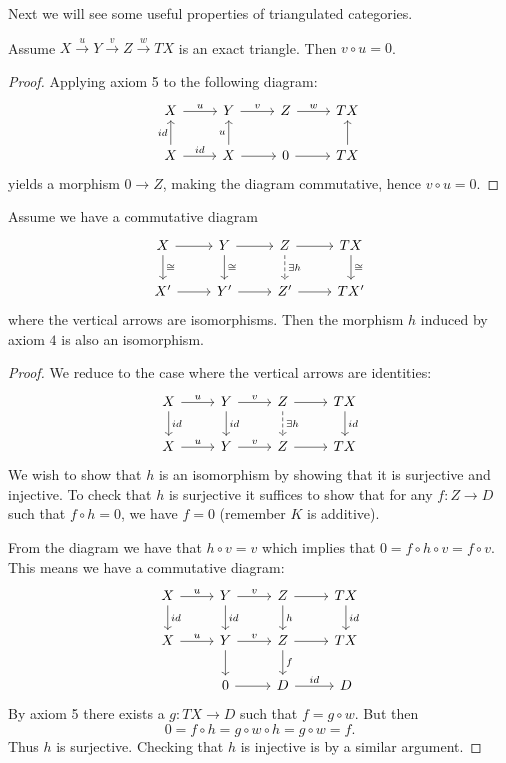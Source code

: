 \documentclass[a4paper, UKenglish]{report}
\begin{document}
Next we will see some useful properties of triangulated categories.

\begin{proposition} 
    \label{prop:compzero}
    Assume $X \xrightarrow{u}  Y \xrightarrow{v} Z \xrightarrow{w} TX$ is an exact triangle. Then $v \circ u = 0$.
\end{proposition}

\begin{proof}
    Applying axiom 5 to the following diagram:
    \[
        \begin{tikzcd}
            X  \ar{r}{u} & Y  \ar{r}{v} & Z  \ar{r}{w} &  TX \\
            X \ar{u}{id} \ar{r}{id} & X \ar{u}{u} \ar{r} & 0 \ar{r} & \ar{u} TX 
        \end{tikzcd}
   \]
yields a morphism $0 \to Z$, making the diagram commutative, hence $v \circ u = 0$.
\end{proof}

\begin{proposition}[$5$-lemma]
    Assume we have a commutative diagram
    \[
        \begin{tikzcd}
            X \ar{d}{\cong} \ar{r} & Y \ar{d}{\cong} \ar{r} & Z \arrow[dashed]{d}{ \exists h} \ar{r} & \ar{d}{\cong} TX \\
            X' \ar{r} & Y' \ar{r} & Z' \ar{r} & TX' 
        \end{tikzcd} 
    \]
    where the vertical arrows are isomorphisms. Then the morphism $h$ induced by axiom $4$ is also an isomorphism.
\end{proposition}

\begin{proof}
    We reduce to the case where the vertical arrows are identities:
    \[
        \begin{tikzcd}
            X \ar{d}{id} \ar{r}{u} & Y \ar{d}{id} \ar{r}{v} & Z \arrow[dashed]{d}{ \exists h} \ar{r} & \ar{d}{id} TX \\
            X \ar{r}{u} & Y \ar{r}{v} & Z \ar{r} & TX 
        \end{tikzcd} 
    \]
    We wish to show that $h$ is an isomorphism by showing that it is surjective and injective. To check that $h$ is surjective it suffices to show that for any $f \colon Z \to D$ such that $f \circ h = 0$, we have $f=0$ (remember $K$ is additive).

    From the diagram we have that $h \circ v=v$ which implies that $0=f \circ h \circ v=f \circ v$. This means we have a commutative diagram:
    \[
        \begin{tikzcd}
            X \ar{d}{id} \ar{r}{u} & Y \ar{d}{id} \ar{r}{v} & Z \arrow{d}{ h} \ar{r} & \ar{d}{id} TX \\
            X \ar{r}{u} & Y \ar{r}{v} \ar{d} & Z \ar{r} \ar{d}{f} & TX \\
            & 0 \ar{r} & D \ar{r}{id} & D
        \end{tikzcd} 
    \]
    By axiom 5 there exists a $g \colon TX \to D$ such that $f = g \circ w$. But then
    \[
        0=f \circ h = g \circ w \circ h = g \circ w = f.
    \]
    Thus $h$ is surjective. Checking that $h$ is injective is by a similar argument.
\end{proof}
\end{document}
